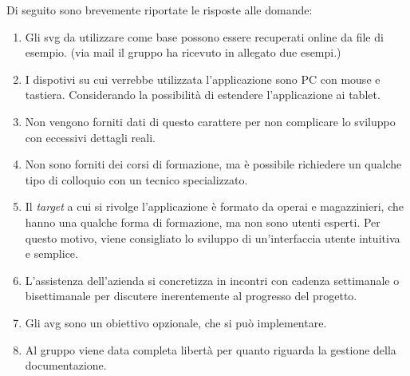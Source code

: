 Di seguito sono brevemente riportate le risposte alle domande:

\begin{enumerate}
    \item Gli svg da utilizzare come base possono essere recuperati online da 
		file di esempio. (via mail il gruppo ha ricevuto in allegato due 
		esempi.)
    \item I dispotivi su cui verrebbe utilizzata l'applicazione sono PC con 
		mouse e tastiera. 
		Considerando la possibilità di estendere l'applicazione ai tablet.
    \item Non vengono forniti dati di questo carattere per non complicare 
		lo sviluppo con eccessivi dettagli reali.
	\item Non sono forniti dei corsi di formazione, ma è possibile richiedere un
		qualche tipo di colloquio con un tecnico specializzato.
	\item Il \textit{target} a cui si rivolge l'applicazione è formato da operai 
		e magazzinieri, che hanno una qualche forma di formazione, ma non sono 
		utenti esperti. Per questo motivo, viene consigliato lo sviluppo di 
		un'interfaccia utente intuitiva e semplice.
    \item L'assistenza dell'azienda si concretizza in incontri 
		con cadenza settimanale o bisettimanale per discutere inerentemente al
		progresso del progetto.
	\item Gli avg sono un obiettivo opzionale, che si può implementare.
    \item Al gruppo viene data completa libertà per quanto riguarda la gestione 
		della documentazione. \\
\end{enumerate}
